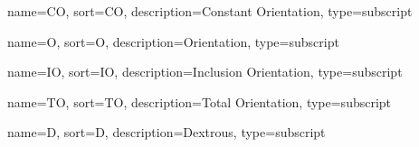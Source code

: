 
	{%
		name={\ensuremath{\mathrm{CO}}},
		sort=CO,
		description=Constant Orientation,
		type=subscript
	}
	\newcommand{\constantOrientation}{\gls{sub:constantOrientation}}

	{%
		name={\ensuremath{\mathrm{O}}},
		sort=O,
		description=Orientation,
		type=subscript
	}
	\newcommand{\orientation}{\gls{sub:orientation}}

	{%
		name={\ensuremath{\mathrm{IO}}},
		sort=IO,
		description=Inclusion Orientation,
		type=subscript
	}
	\newcommand{\inclusionOrientation}{\gls{sub:inclusionOrientation}}

	{%
		name={\ensuremath{\mathrm{TO}}},
		sort=TO,
		description=Total Orientation,
		type=subscript
	}
	\newcommand{\totalOrientation}{\gls{sub:totalOrientation}}

	{%
		name={\ensuremath{\mathrm{D}}},
		sort=D,
		description=Dextrous,
		type=subscript
	}
	\newcommand{\dextrous}{\gls{sub:dextrous}}
